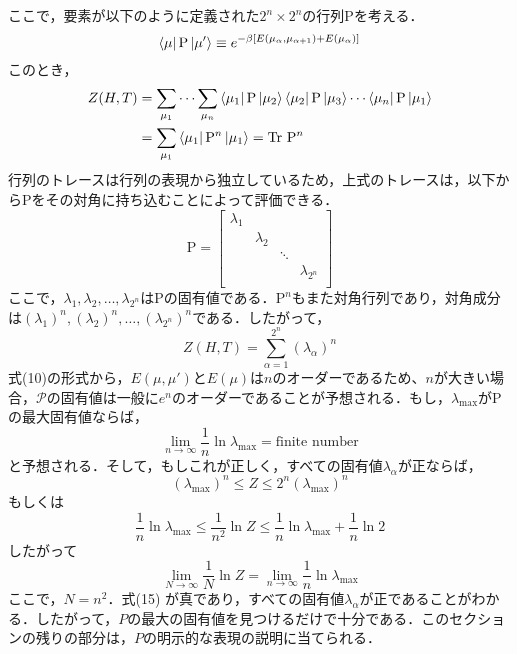 \documentclass[a4paper,11pt]{jsarticle}
\begin{document}
ここで，要素が以下のように定義された$2^n \times 2^n$の行列$\mathrm{P}$を考える．
\begin{equation}
  \bra{\mu} \mathrm{P} \ket{\mu'} \equiv e^{-\beta [E(\mu_{\alpha}, \mu_{\alpha+1}) + E(\mu_{\alpha})]}
\end{equation}
このとき，
\begin{align}
  Z(H,T)
  &= \sum_{\mu_1} \cdots \sum_{\mu_n} \bra{\mu_1} \mathrm{P} \ket{\mu_2}\bra{\mu_2} \mathrm{P} \ket{\mu_3}\cdots\bra{\mu_n} \mathrm{P} \ket{\mu_1} \\
  &= \sum_{\mu_1}\bra{\mu_1} \mathrm{P}^n \ket{\mu_1} = \mathrm{Tr} \ \mathrm{P}^n
\end{align}
行列のトレースは行列の表現から独立しているため，上式のトレースは，以下から$\mathrm{P}$をその対角に持ち込むことによって評価できる．
\begin{equation}
  \mathrm{P} = \begin{bmatrix}
    \lambda_1 & & & \\
     & \lambda_2 & & \\
     & & \ddots & \\
     & & & \lambda_{2^n} \\
  \end{bmatrix}
\end{equation}
ここで，$\lambda_1, \lambda_2, \dots, \lambda_{2^n}$は$\mathrm{P}$の固有値である．$\mathrm{P}^n$もまた対角行列であり，対角成分は$(\lambda_1)^n, (\lambda_2)^n, \dots, (\lambda_{2^n})^n$である．したがって，
\begin{equation}
  Z(H,T)
  = \sum_{\alpha=1}^{2^n} (\lambda_\alpha)^n
\end{equation}
式(10)の形式から，$E(\mu, \mu')$と$E(\mu)$は$n$のオーダーであるため、$n$が大きい場合，$\mathcal{P}$の固有値は一般に$e^n$のオーダーであることが予想される．もし，$\lambda_{\text{max}}$が$\mathrm{P}$の最大固有値ならば，
\begin{equation}
  \lim_{n \rightarrow \infty} \frac{1}{n} \ln{\lambda}_{\text{max}}
  = \text{finite number}
\end{equation}
と予想される．そして，もしこれが正しく，すべての固有値$\lambda_{\alpha}$が正ならば，
\begin{equation}
  (\lambda_{\text{max}})^n \leq Z \leq 2^n (\lambda_{\max})^n
\end{equation}
もしくは
\begin{equation}
  \frac{1}{n}\ln{\lambda_{\text{max}}}
  \leq \frac{1}{n^2}\ln{Z}
  \leq \frac{1}{n}\ln{\lambda_{\text{max}}} + \frac{1}{n} \ln{2}
\end{equation}
したがって
\begin{equation}
  \lim_{N \rightarrow \infty} \frac{1}{N} \ln{Z}
  = \lim_{n \rightarrow \infty} \frac{1}{n} \ln{\lambda_{\text{max}}}
\end{equation}
ここで，$N=n^2$．式(15) が真であり，すべての固有値$\lambda_{\alpha}$が正であることがわかる．したがって，$P$の最大の固有値を見つけるだけで十分である．このセクションの残りの部分は，$P$の明示的な表現の説明に当てられる．\par
\end{document}
